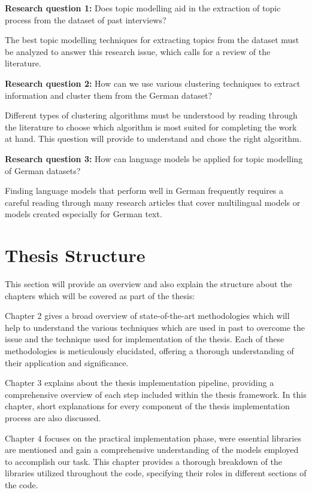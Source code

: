 \noindent\textbf{Research question 1: }  
Does topic modelling aid in the extraction of topic process from the dataset of past interviews?

\noindent The best topic modelling techniques for extracting topics from the dataset must be analyzed to answer 
this research issue, which calls for a review of the literature.

\noindent\textbf{Research question 2: }
How can we use various clustering techniques to extract information and cluster them from the German dataset?

\noindent Different types of clustering algorithms must be understood by reading through the literature to 
choose which algorithm is most suited for completing the work at hand. This question will provide to understand 
and chose the right algorithm.

\noindent\textbf{Research question 3: }
How can language models be applied for topic modelling of German datasets?

\noindent Finding language models that perform well in German frequently requires a careful reading through many research articles that cover 
multilingual models or models created especially for German text.
\vspace{10cm}
\section{Thesis Structure}

This section will provide an overview and also explain the structure about the chapters which will be covered as part of the thesis:

Chapter 2 gives a broad overview of state-of-the-art methodologies which will help to understand the various techniques which are
 used in past to overcome the issue and the technique used for implementation of the thesis. Each of these methodologies is 
 meticulously elucidated, offering a thorough understanding of their application and significance.

Chapter 3 explains about the thesis implementation pipeline, providing a comprehensive overview of each step included
 within the thesis framework. In this chapter, short explanations for every component of the thesis implementation process
  are also discussed.

Chapter 4 focuses on the practical implementation phase, were essential libraries are mentioned and gain a comprehensive understanding
 of the models employed to accomplish our task. This chapter provides a thorough breakdown of the libraries utilized throughout the 
 code, specifying their roles in different sections of the code.

